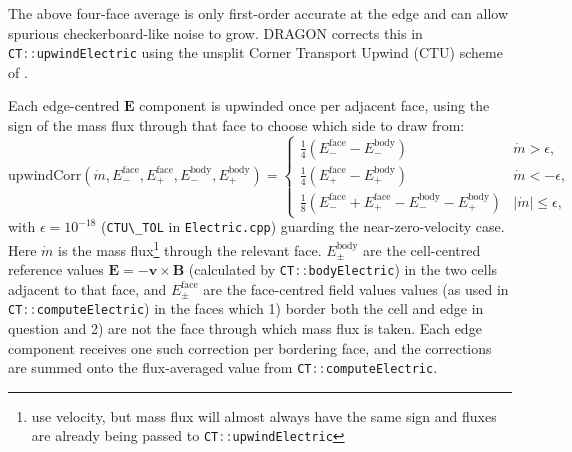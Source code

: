 \documentclass[11pt]{report}
\newcommand{\cpp}[1]{\lstinline[language=C++]{#1}}
\newcommand{\bash}[1]{\lstinline[language=bash]{#1}}
\begin{document}

The above four-face average is only first-order accurate at the edge and can allow spurious checkerboard-like noise to grow. 
DRAGON corrects this in \cpp{CT::upwindElectric} using the unsplit Corner Transport Upwind (CTU) scheme of \citet{GardinerStone2008}.


Each edge-centred $\mathbf{E}$ component is upwinded once per adjacent
face, using the sign of the mass flux through that face to choose
which side to draw from:
\begin{equation}
    \mathrm{upwindCorr}(\dot m, E^{\mathrm{face}}_{-}, E^{\mathrm{face}}_{+},
        E^{\mathrm{body}}_{-}, E^{\mathrm{body}}_{+}) =
    \begin{cases}
        \tfrac14\left(E^{\mathrm{face}}_{-} - E^{\mathrm{body}}_{-}\right)
            & \dot m > \epsilon, \\[4pt]
        \tfrac14\left(E^{\mathrm{face}}_{+} - E^{\mathrm{body}}_{+}\right)
            & \dot m < -\epsilon, \\[4pt]
        \tfrac18\left(E^{\mathrm{face}}_{-} + E^{\mathrm{face}}_{+}
            - E^{\mathrm{body}}_{-} - E^{\mathrm{body}}_{+}\right)
            & |\dot m| \le \epsilon,
    \end{cases}
\end{equation}
with $\epsilon = 10^{-18}$ (\cpp{CTU\_TOL} in \bash{Electric.cpp}) guarding the near-zero-velocity case. 
Here $\dot m$ is the mass flux\footnote{\citet{GardinerStone2008} use velocity, but mass flux will almost always have the same sign and fluxes are already being passed to \cpp{CT::upwindElectric}} through the relevant face.
$E^{\mathrm{body}}_{\pm}$ are the cell-centred reference values $\mathbf{E} = -\mathbf{v} \times \mathbf{B}$ (calculated by \cpp{CT::bodyElectric}) in the two cells adjacent to that face, and  $E^{\mathrm{face}}_{\pm}$ are the face-centred field values values (as used in \cpp{CT::computeElectric}) in the faces which 1) border both the cell and edge in question and 2) are not the face through which mass flux is taken.
Each edge component receives one such correction per bordering face, and the corrections are summed onto the flux-averaged value from \cpp{CT::computeElectric}.
\end{document}

